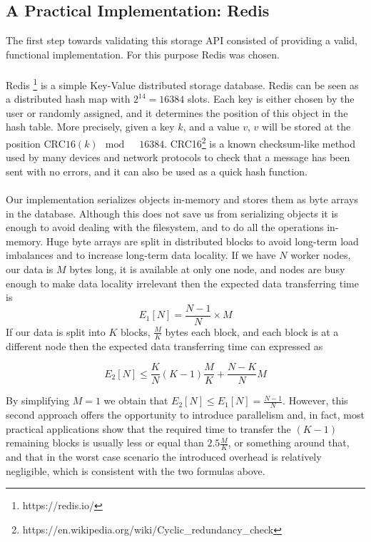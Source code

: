 \subsection{A Practical Implementation: Redis}
\label{subsec:storage_redis}
The first step towards validating this storage API consisted of providing a valid, functional implementation. For this purpose Redis was chosen.\\
\\
Redis \footnote{https://redis.io/} is a simple Key-Value distributed storage database. Redis can be seen as a distributed hash map with $2^14 = 16384$ slots. Each key is either chosen by the user or randomly assigned, and it determines the position of this object in the hash table. More precisely, given a key $k$, and a value $v$, $v$ will be stored at the position $\textrm{CRC16}(k) \mod \quad 16384$. CRC16\footnote{https://en.wikipedia.org/wiki/Cyclic\_redundancy\_check} is a known checksum-like method used by many devices and network protocols to check that a message has been sent with no errors, and it can also be used as a quick hash function.\\
\\
Our implementation serializes objects in-memory and stores them as byte arrays in the database. Although this does not save us from serializing objects it is enough to avoid dealing with the filesystem, and to do all the operations in-memory. Huge byte arrays are split in distributed blocks to avoid long-term load imbalances and to increase long-term data locality. If we have $N$ worker nodes, our data is $M$ bytes long, it is available at only one node, and nodes are busy enough to make data locality irrelevant then the expected data transferring time is
$$E_1[N] = \frac{N - 1}{N} \times M$$
If our data is split into $K$ blocks, $\frac{M}{K}$ bytes each block, and each block is at a different node then the expected data transferring time can expressed as

$$E_2[N] \leq \frac{K}{N}(K - 1)\frac{M}{K} + \frac{N - K}{N}M$$

By simplifying $M = 1$ we obtain that $E_2[N] \leq E_1[N] = \frac{N - 1}{N}$. However, this second approach offers the opportunity to introduce parallelism and, in fact, most practical applications show that the required time to transfer the $(K - 1)$ remaining blocks is usually less or equal than $2.5\frac{M}{K}$, or something around that, and that in the worst case scenario the introduced overhead is relatively negligible, which is consistent with the two formulas above.

